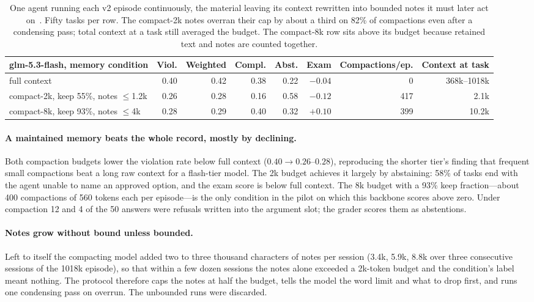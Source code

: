 \documentclass{article} %
\newcommand{\pilot}{}
\newcommand{\pilot}{\textcolor{pilotfg}{\textsc{\scriptsize pilot}}}
\begin{document}
\begin{table}[t]
\centering\small
\begin{tabular}{@{}lrrrrrrr@{}}
\toprule
glm-5.3-flash, memory condition & Viol. & Weighted & Compl. & Abst. & Exam & Compactions/ep. & Context at task \\
\midrule
full context & 0.40 & 0.42 & 0.38 & 0.22 & $-0.04$ & 0 & 368k--1018k \\
compact-2k, keep 55\%, notes $\le$1.2k & 0.26 & 0.28 & 0.16 & 0.58 & $-0.12$ & 417 & 2.1k \\
compact-8k, keep 93\%, notes $\le$4k & 0.28 & 0.29 & 0.40 & 0.32 & $+0.10$ & 399 & 10.2k \\
\bottomrule
\end{tabular}
\caption{One agent running each v2 episode continuously, the material leaving its context rewritten into bounded notes it must later act on~\pilot. Fifty tasks per row. The compact-2k notes overran their cap by about a third on 82\% of compactions even after a condensing pass; total context at a task still averaged the budget. The compact-8k row sits above its budget because retained text and notes are counted together.}
\label{tab:pilot-compact}
\end{table}

\paragraph{A maintained memory beats the whole record, mostly by declining.} Both compaction budgets lower the violation rate below full context ($0.40 \to 0.26$--$0.28$), reproducing the shorter tier's finding that frequent small compactions beat a long raw context for a flash-tier model. The 2k budget achieves it largely by abstaining: 58\% of tasks end with the agent unable to name an approved option, and the exam score is below full context. The 8k budget with a 93\% keep fraction---about 400 compactions of 560 tokens each per episode---is the only condition in the pilot on which this backbone scores above zero. Under compaction 12 and 4 of the 50 answers were refusals written into the argument slot; the grader scores them as abstentions.

\paragraph{Notes grow without bound unless bounded.} Left to itself the compacting model added two to three thousand characters of notes per session (3.4k, 5.9k, 8.8k over three consecutive sessions of the 1018k episode), so that within a few dozen sessions the notes alone exceeded a 2k-token budget and the condition's label meant nothing. The protocol therefore caps the notes at half the budget, tells the model the word limit and what to drop first, and runs one condensing pass on overrun. The unbounded runs were discarded.
\end{document}

